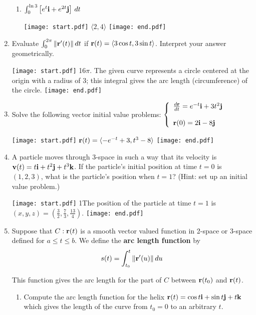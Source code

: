 \documentclass[12pt]{article}
\begin{document}
\begin{enumerate}
\begin{enumerate}
\item $\int_0^{\ln3} \left[e^t{\bf i}+e^{2t}{\bf j}\right] \,dt$

\texttt{[image: start.pdf]}
{{$\langle 2,4 \rangle$}}
\texttt{[image: end.pdf]}


\end{enumerate}

\item  Evaluate $\int_0^{2\pi} \|{\bf r}^{\prime}(t)\| \,dt$ if ${\bf r}(t)=\langle 3\cos{t}, 3\sin{t} \rangle$.  Interpret your answer geometrically.

\texttt{[image: start.pdf]}
{{{1\linewidth}{$6\pi$.  The given curve represents a circle centered at the origin with a radius of 3; this integral gives the arc length (circumference) of the circle.}}}
\texttt{[image: end.pdf]}


\item Solve the following vector initial value problems: $\left\{\begin{array}{l}
\frac{d{\bf r}}{dt}=e^{-t}{\bf i}+3t^2{\bf j}\\
\\
{\bf r}(0)=2{\bf i}-8{\bf j}\end{array}\right.$

\texttt{[image: start.pdf]}
{{${\bf r}(t)=\langle -e^{-t}+3, t^3-8 \rangle$}}
\texttt{[image: end.pdf]}


\item A particle moves through 3-space in such a way that its velocity is ${\bf v}(t)=t{\bf i}+t^2{\bf j}+t^3{\bf k}$.  If the particle's initial position at time $t=0$ is $(1,2,3)$, what is the particle's position when $t=1$? (Hint: set up an initial value problem.)

\texttt{[image: start.pdf]}
{{{1\linewidth}{The position of the particle at time $t=1$ is $(x,y,z)=\left( \frac{3}{2}, \frac{7}{3}, \frac{13}{4}\right)$.}}}
\texttt{[image: end.pdf]}


\item Suppose that $C: {\bf r}(t)$ is a smooth vector valued function in 2-space or 3-space defined for $a \leq t \leq b$.  We define the {\bf arc length function} by $$s(t)=\int_{t_0}^t \|{\bf r}^{\prime}(u)\| \,du$$

This function gives the arc length for the part of $C$ between ${\bf r}(t_0)$ and ${\bf r}(t)$.

\begin{enumerate}

\item Compute the arc length function for the helix ${\bf r}(t)=\cos{t} {\bf i}+\sin{t} {\bf j}+t {\bf k}$ which gives the length of the curve from $t_0=0$ to an arbitrary $t$.


\end{enumerate}
\end{enumerate}
\end{document}
